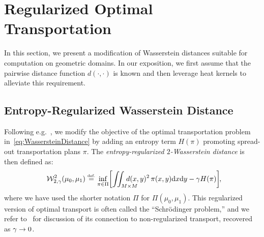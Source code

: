 
\section{Regularized Optimal Transportation}

In this section, we present a modification of Wasserstein distances suitable for computation on geometric domains.   
In our exposition, we first assume that the pairwise distance function $d(\cdot,\cdot)$ is known and then leverage heat kernels to alleviate this requirement.%

\subsection{Entropy-Regularized Wasserstein Distance}


Following e.g.~\cite{cuturi-2013,Benamou-IterBregman-2014}, we modify the objective of the optimal transportation problem in~\eqref{eq:WassersteinDistance} by adding an entropy term $H(\pi)$ promoting spread-out transportation plans $\pi$. The \emph{entropy-regularized $2$-Wasserstein distance} is then defined as:
\begin{equation}
\label{eq:entropyWassersteinDistance}
	\W_{2,\gamma}^2(\mu_0,\mu_1)  \eqdef  
	\inf_{\pi\in\Pi} \hspace{-.025in} \left[ \iint_{M\times M}\hspace{-.25in} d(x,y)^2\,\pi(x,y)\dx\dy  -  \gamma H(\pi)  \right]\hspace{-1mm},
\hspace{-2mm}
\end{equation}
where we have used the shorter notation $\Pi$ for $\Pi(\mu_0,\mu_1)$. %
This regularized version of optimal transport is often called the ``Schr\"odinger problem,'' and we refer to~\cite{leonard-2012} for discussion of its connection to non-regularized transport, recovered as $\gamma \rightarrow 0$. 

